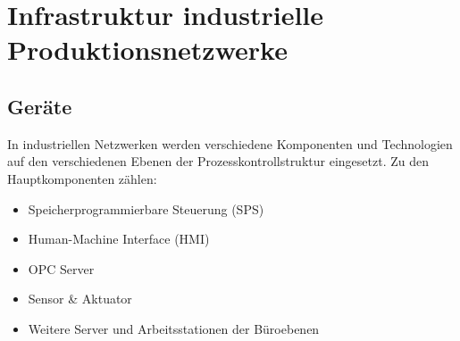 \section{Infrastruktur industrielle Produktionsnetzwerke}
\subsection{Geräte}
In industriellen Netzwerken werden verschiedene Komponenten und Technologien auf den verschiedenen Ebenen der Prozesskontrollstruktur eingesetzt. Zu den Hauptkomponenten zählen:
\begin{itemize}
\item Speicherprogrammierbare Steuerung (SPS)
\item Human-Machine Interface (HMI)
\item OPC Server
\item Sensor \& Aktuator
\item Weitere Server und Arbeitsstationen der Büroebenen
\end{itemize}

